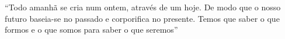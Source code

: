 ``Todo amanhã se cria num ontem, através de um hoje. De modo que o nosso futuro baseia-se no passado e corporifica no presente. Temos que saber o que formos e o que somos para saber o que seremos''


